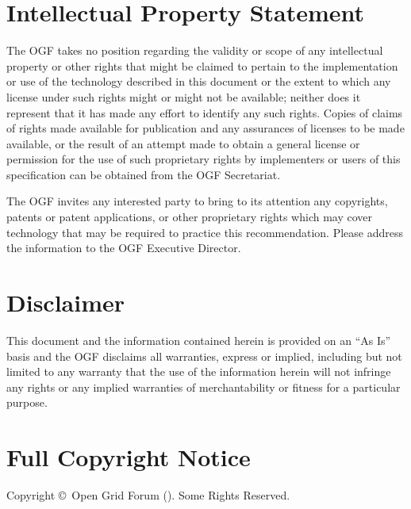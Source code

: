 
\section{Intellectual Property Statement}

The OGF takes no position regarding the validity or scope of any intellectual property or other rights that might be claimed to pertain to the implementation or use of the technology described in this document or the extent to which any license under such rights might or might not be available; neither does it represent that it has made any effort to identify any such rights.  Copies of claims of rights made available for publication and any assurances of licenses to be made available, or the result of an attempt made to obtain a general license or permission for the use of such proprietary rights by implementers or users of this specification can be obtained from the OGF Secretariat.

The OGF invites any interested party to bring to its attention any copyrights, patents or patent applications, or other proprietary rights which may cover technology that may be required to practice this recommendation.  Please address the information to the OGF Executive Director.

\section{Disclaimer}

This document and the information contained herein is provided on an ``As Is'' basis and the OGF disclaims all warranties, express or implied, including but not limited to any warranty that the use of the information herein will not infringe any rights or any implied warranties of merchantability or fitness for a particular purpose.

\section{Full Copyright Notice}

Copyright \copyright \ Open Grid Forum (\copyrightyears). Some Rights Reserved.

